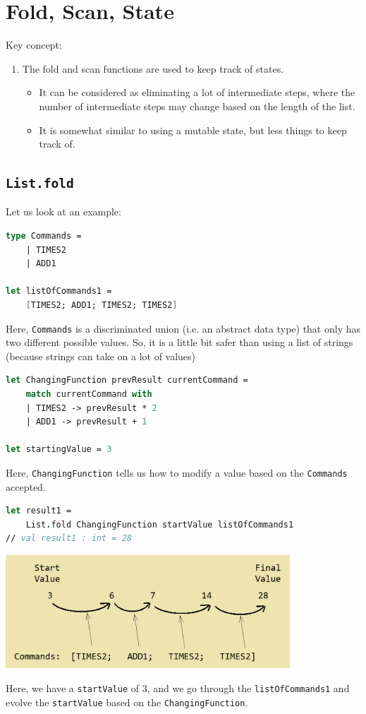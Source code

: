 \documentclass[12pt]{article}
\begin{document}
\pagebreak

\section{Fold, Scan, State}
Key concept:
\begin{enumerate}
\item The fold and scan functions are used to keep track of states.
\begin{itemize}
\item It can be considered as eliminating a lot of intermediate steps, where the number of intermediate steps may change based on the length of the list.
\item It is somewhat similar to using a mutable state, but less things to keep track of.
\end{itemize}
\end{enumerate}
\subsection{\texttt{List.fold}}
Let us look at an example:
\begin{lstlisting}[language=FSharp]
type Commands =
    | TIMES2
    | ADD1

let listOfCommands1 =
    [TIMES2; ADD1; TIMES2; TIMES2]
\end{lstlisting}
Here, \texttt{Commands} is a discriminated union (i.e. an abstract data type) that only has two different possible values. So, it is a little bit safer than using a list of strings (because strings can take on a lot of values)

\begin{lstlisting}[language=FSharp]
let ChangingFunction prevResult currentCommand =
    match currentCommand with
    | TIMES2 -> prevResult * 2
    | ADD1 -> prevResult + 1

let startingValue = 3
\end{lstlisting}
Here, \texttt{ChangingFunction} tells us how to modify a value based on the \texttt{Commands} accepted.

\begin{lstlisting}[language=FSharp]
let result1 =
    List.fold ChangingFunction startValue listOfCommands1
// val result1 : int = 28
\end{lstlisting}

\begin{center}
\includegraphics[width=0.8\textwidth]{pictures/picture31.png}
\end{center}
Here, we have a \texttt{startValue} of $3$, and we go through the \texttt{listOfCommands1} and evolve the \texttt{startValue} based on the \texttt{ChangingFunction}.
\end{document}
